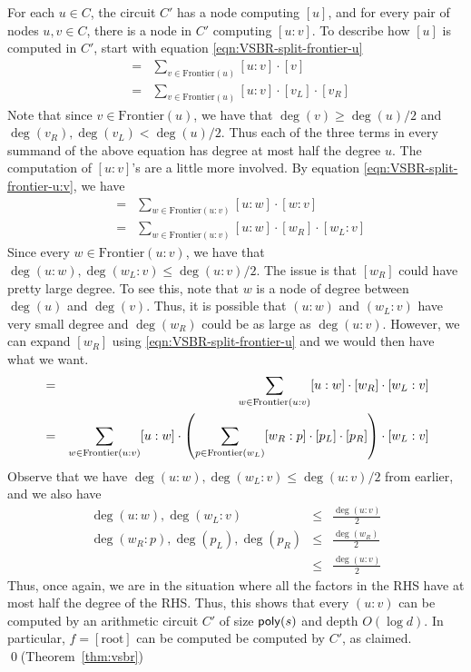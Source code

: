 For each $u \in C$, the circuit $C'$ has a node computing $[u]$, and for every pair of nodes $u,v\in C$, there is a node in $C'$ computing $[u:v]$. To describe how $[u]$ is computed in $C'$, start with equation \eqref{eqn:VSBR-split-frontier-u}
\begin{eqnarray*}
[u] &=& \sum_{v\in \mathrm{Frontier}(u)} [u:v]\cdot [v]\\
 & = & \sum_{v\in \mathrm{Frontier}(u)} [u:v] \cdot [v_L] \cdot [v_R]
\end{eqnarray*}
Note that since $v\in \mathrm{Frontier}(u)$, we have that $\deg(v) \geq \deg(u)/2$ and $\deg(v_R),\deg(v_L) < \deg(u)/2$. Thus each of the three terms in every summand of the above equation has degree at most half the degree $u$. The computation of $[u:v]$'s are a little more involved. By equation \eqref{eqn:VSBR-split-frontier-u:v}, we have
\begin{eqnarray*}
[u:v] &=& \sum_{w\in \mathrm{Frontier}(u:v)} [u:w]\cdot [w:v]\\
      &=& \sum_{w\in \mathrm{Frontier}(u:v)} [u:w]\cdot [w_R]\cdot  [w_L:v]
\end{eqnarray*}
Since every $w \in \mathrm{Frontier}(u:v)$, we have that $\deg(u:w),\deg(w_L:v) \leq \deg(u:v)/2$. The issue is that $[w_R]$ could have pretty large degree. To see this, note that $w$ is a node of degree between $\deg(u)$ and $\deg(v)$. Thus, it is possible that $(u:w)$ and $(w_L:v)$ have very small degree and $\deg(w_R)$ could be as large as $\deg(u:v)$. However, we can expand $[w_R]$ using \eqref{eqn:VSBR-split-frontier-u} and we would then have what we want. 
\begin{eqnarray*}
[u:v] &=& \sum_{w\in \mathrm{Frontier}(u:v)} [u:w]\cdot [w_R]\cdot  [w_L:v]\\
      &=& \sum_{w\in \mathrm{Frontier}(u:v)} [u:w]\cdot \inparen{\sum_{p \in \mathrm{Frontier}(w_L)} [w_R:p] \cdot [p_L] \cdot [p_R]} \cdot  [w_L:v]
\end{eqnarray*}
Observe that we have $\deg (u:w), \deg(w_L:v) \leq \deg(u:v)/2$ from earlier, and we also have
\begin{eqnarray*}
\deg(u:w),\deg(w_L:v) & \leq &\frac{\deg(u:v)}{2}\\
\deg(w_R:p),\deg(p_L),\deg(p_R) & \leq & \frac{\deg(w_R)}{2}\\
 & \leq & \frac{\deg(u:v)}{2}
\end{eqnarray*}
Thus, once again, we are in the situation where all the factors in the RHS have at most half the degree of the RHS. Thus, this shows that every $(u:v)$ can be computed by an arithmetic circuit $C'$ of size $\mathsf{poly}(s)$ and depth $O(\log d)$. In particular, $f = [\mathrm{root}]$ can be computed be computed by $C'$, as claimed. \qed {(\footnotesize Theorem~\ref{thm:vsbr})}\\

